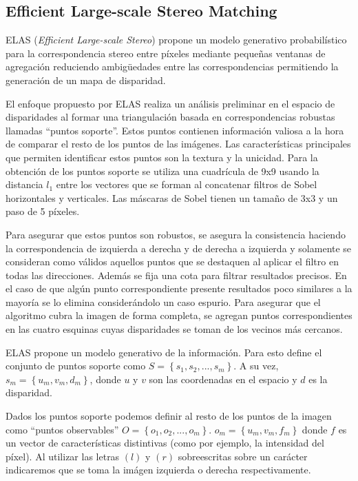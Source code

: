 \documentclass[11pt,a4paper,titlepage]{article}
\begin{document}
\subsection{Efficient Large-scale Stereo Matching}

ELAS (\textit{Efficient Large-scale Stereo}) propone un modelo generativo probabilístico para la correspondencia stereo entre píxeles mediante pequeñas ventanas de agregación reduciendo ambigüedades entre las correspondencias permitiendo la generación de un mapa de disparidad.

El enfoque propuesto por ELAS realiza un análisis preliminar en el espacio de disparidades al formar una triangulación basada en correspondencias robustas llamadas “puntos soporte”. Estos puntos contienen información valiosa a la hora de comparar el resto de los puntos de las imágenes. Las características principales que permiten identificar estos puntos son la textura y la unicidad. Para la obtención de los puntos soporte se utiliza una cuadrícula de 9x9 usando la distancia $l_1$ entre los vectores que se forman al concatenar filtros de Sobel horizontales y verticales. Las máscaras de Sobel tienen un tamaño de 3x3 y un paso de 5 píxeles.

Para asegurar que estos puntos son robustos, se asegura la consistencia haciendo la correspondencia de izquierda a derecha y de derecha a izquierda y solamente se consideran como válidos aquellos puntos que se destaquen al aplicar el filtro en todas las direcciones. Además se fija una cota para filtrar resultados precisos. En el caso de que algún punto correspondiente presente resultados poco similares a la mayoría se lo elimina considerándolo un caso espurio. Para asegurar que el algoritmo cubra la imagen de forma completa, se agregan puntos correspondientes en las cuatro esquinas cuyas disparidades se toman de los vecinos más cercanos.

ELAS propone un modelo generativo de la información. Para esto define el conjunto de puntos soporte como $S = \left\{ s_1, s_2, ... , s_m \right\}$. A su vez, $s_m = \left\{ u_m, v_m, d_m \right\}$, donde $u$ y $v$ son las coordenadas en el espacio y $d$ es la disparidad.

Dados los puntos soporte podemos definir al resto de los puntos de la imagen como “puntos observables” $O = \left\{ o_1, o_2, ... , o_m \right\}$. $o_m = \left\{ u_m, v_m, f_m \right\}$ donde $f$ es un vector de características distintivas (como por ejemplo, la intensidad del píxel). Al utilizar las letras $(l)$ y $(r)$ sobreescritas sobre un carácter indicaremos que se toma la imágen izquierda o derecha respectivamente.
\end{document}

